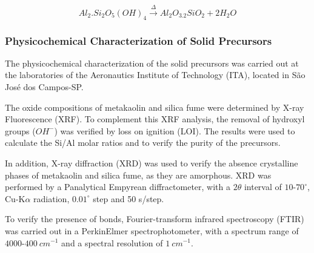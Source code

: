 \begin{equation}
    \label{eq:calcination_kaolin}
        Al_2.Si_2O_5\left(OH\right)_4 \xrightarrow{\Delta} Al_2O_3.2SiO_2 + 2 H_2O
\end{equation}

\subsubsection{Physicochemical Characterization of Solid Precursors}
\label{sec:physicochemical_characterization_precursors}

The physicochemical characterization of the solid precursors was carried out at the laboratories of the Aeronautics Institute of Technology (ITA), located in São José dos Campos-SP.

The oxide compositions of metakaolin and silica fume were determined by X-ray Fluorescence (XRF).
To complement this XRF analysis, the removal of hydroxyl groups ($OH^-$) was verified by loss on ignition (LOI).
The results were used to calculate the Si/Al molar ratios and to verify the purity of the precursors.


In addition, X-ray diffraction (XRD) was used to verify the absence crystalline phases of metakaolin and silica fume, as they are amorphous.
XRD was performed by a Panalytical Empyrean diffractometer, with a $2\theta$ interval of $10$-$70^\circ$, Cu-$\mathrm{K}\alpha$ radiation, $0.01^\circ$ step and 50 s/step.


To verify the presence of bonds, Fourier-transform infrared spectroscopy (FTIR) was carried out in a PerkinElmer spectrophotometer, with a spectrum range of $4000$-$400\ cm^{-1}$ and a spectral resolution of $1\ cm^{-1}$.

